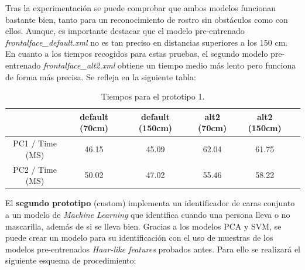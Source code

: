 Tras la experimentación se puede comprobar que ambos modelos funcionan bastante bien, tanto para un reconocimiento de rostro sin obstáculos como con ellos. Aunque, es importante destacar que el modelo pre-entrenado \textit{frontalface\_default.xml} no es tan preciso en distancias superiores a los 150 cm. En cuanto a los tiempos recogidos para estas pruebas, el segundo modelo pre-entrenado \textit{frontalface\_alt2.xml} obtiene un tiempo medio más lento pero funciona de forma más precisa. Se refleja en la siguiente tabla:

\begin{table}[h!]
	\begin{center}
		\begin{tabular}{ |c|c|c|c|c|c| } 
			\hline
			& default (70cm) & default (150cm) & alt2 (70cm) & alt2 (150cm) \\
			\hline
			PC1 / Time (MS) & 46.15  & 45.09 & 62.04  & 61.75 \\
			\hline
			PC2 / Time (MS) & 50.02  & 47.02 & 55.46  & 58.22 \\
			\hline
		\end{tabular}
		\caption{Tiempos para el prototipo 1.}
		\label{tab:table2}
	\end{center}
\end{table}

El \textbf{segundo prototipo} (custom) implementa un identificador de caras conjunto a un modelo de \textit{Machine Learning} que identifica cuando una persona lleva o no mascarilla, además de si se lleva bien. Gracias a los modelos PCA y SVM, se puede crear un modelo para su identificación con el uso de muestras de los modelos pre-entrenados \textit{Haar-like features} probados antes. Para ello se realizará el siguiente esquema de procedimiento:

